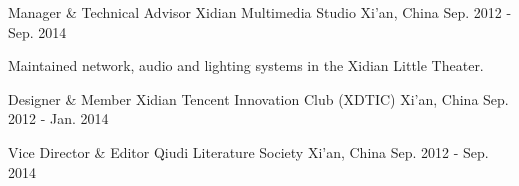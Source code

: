 

\begin{cventries}

  \cventry
    {Manager \& Technical Advisor} %
    {Xidian Multimedia Studio} %
    {Xi'an, China} %
    {Sep. 2012 - Sep. 2014} %
    {
      \begin{cvitems} %
        \item {Maintained network, audio and lighting systems in the Xidian Little Theater.}
      \end{cvitems}
    }

  \cventrys
    {Designer \& Member} %
    {Xidian Tencent Innovation Club (XDTIC)} %
    {Xi'an, China} %
    {Sep. 2012 - Jan. 2014} %

  \cventrys
    {Vice Director \& Editor} %
    {Qiudi Literature Society} %
    {Xi'an, China} %
    {Sep. 2012 - Sep. 2014} %

\end{cventries}
